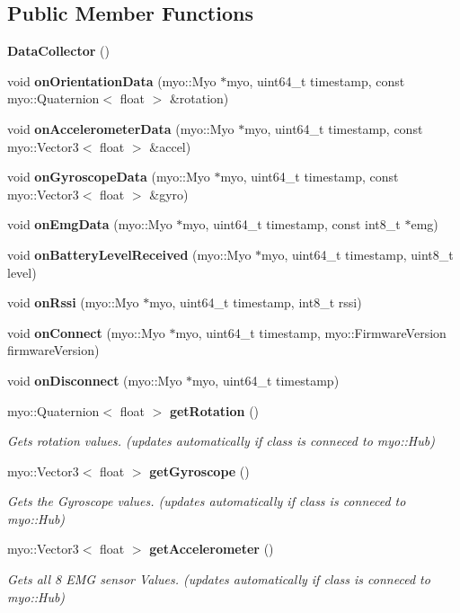 \subsection*{Public Member Functions}
\begin{DoxyCompactItemize}
\item 
\textbf{ Data\+Collector} ()
\item 
void \textbf{ on\+Orientation\+Data} (myo\+::\+Myo $\ast$myo, uint64\+\_\+t timestamp, const myo\+::\+Quaternion$<$ float $>$ \&rotation)
\item 
void \textbf{ on\+Accelerometer\+Data} (myo\+::\+Myo $\ast$myo, uint64\+\_\+t timestamp, const myo\+::\+Vector3$<$ float $>$ \&accel)
\item 
void \textbf{ on\+Gyroscope\+Data} (myo\+::\+Myo $\ast$myo, uint64\+\_\+t timestamp, const myo\+::\+Vector3$<$ float $>$ \&gyro)
\item 
void \textbf{ on\+Emg\+Data} (myo\+::\+Myo $\ast$myo, uint64\+\_\+t timestamp, const int8\+\_\+t $\ast$emg)
\item 
void \textbf{ on\+Battery\+Level\+Received} (myo\+::\+Myo $\ast$myo, uint64\+\_\+t timestamp, uint8\+\_\+t level)
\item 
void \textbf{ on\+Rssi} (myo\+::\+Myo $\ast$myo, uint64\+\_\+t timestamp, int8\+\_\+t rssi)
\item 
void \textbf{ on\+Connect} (myo\+::\+Myo $\ast$myo, uint64\+\_\+t timestamp, myo\+::\+Firmware\+Version firmware\+Version)
\item 
void \textbf{ on\+Disconnect} (myo\+::\+Myo $\ast$myo, uint64\+\_\+t timestamp)
\item 
myo\+::\+Quaternion$<$ float $>$ \textbf{ get\+Rotation} ()
\begin{DoxyCompactList}\small\item\em Gets rotation values. (updates automatically if class is conneced to myo\+::\+Hub) \end{DoxyCompactList}\item 
myo\+::\+Vector3$<$ float $>$ \textbf{ get\+Gyroscope} ()
\begin{DoxyCompactList}\small\item\em Gets the Gyroscope values. (updates automatically if class is conneced to myo\+::\+Hub) \end{DoxyCompactList}\item 
myo\+::\+Vector3$<$ float $>$ \textbf{ get\+Accelerometer} ()
\begin{DoxyCompactList}\small\item\em Gets all 8 E\+MG sensor Values. (updates automatically if class is conneced to myo\+::\+Hub) \end{DoxyCompactList}\item 

\end{DoxyCompactItemize}
